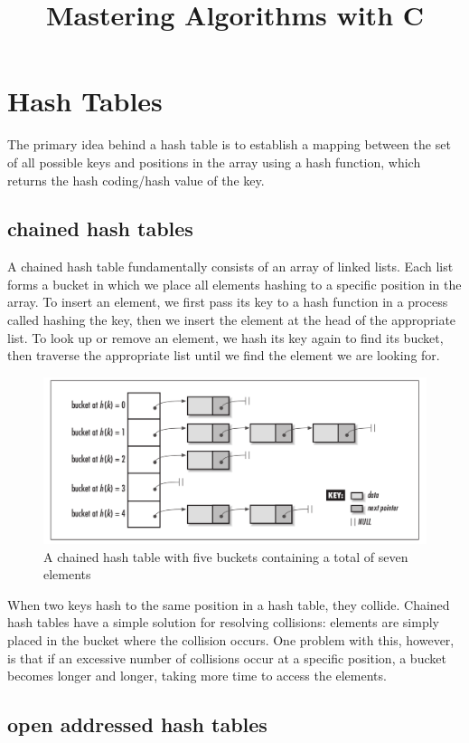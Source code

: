 \documentclass{article}
\begin{document}
    \title{Mastering Algorithms with C}
    \maketitle

    \tableofcontents

    \section{Hash Tables}
    
    The primary idea behind a hash table is to establish a mapping between the set of all possible keys and positions in the array using a hash function, which returns the hash coding/hash value of the key.

    \subsection{chained hash tables}

    A chained hash table fundamentally consists of an array of linked lists. Each list forms a bucket in which we place all elements hashing to a specific position in the array. To insert an element, we first pass its key to a hash function in a process called hashing the key, then we insert the element at the head of the appropriate list. To look up or remove an element, we hash its key again to find its bucket, then traverse the appropriate list until we find the element we are looking for.
    \begin{figure}[h]
    \centering
    \includegraphics[width=0.5\linewidth]{images/hash-tables-1}
    \caption{A chained hash table with five buckets containing a total of seven elements}
    \end{figure}

    When two keys hash to the same position in a hash table, they collide. Chained hash tables have a simple solution for resolving collisions: elements are simply placed in the bucket where the collision occurs. One problem with this, however, is that if an excessive number of collisions occur at a specific position, a bucket becomes longer and longer, taking more time to access the elements.
    \subsection{open addressed hash tables}
\end{document}
